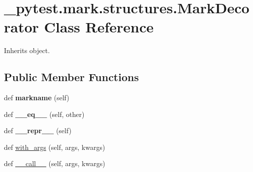 \hypertarget{class__pytest_1_1mark_1_1structures_1_1_mark_decorator}{}\section{\+\_\+pytest.\+mark.\+structures.\+Mark\+Decorator Class Reference}
\label{class__pytest_1_1mark_1_1structures_1_1_mark_decorator}


Inherits object.

\subsection*{Public Member Functions}
\begin{DoxyCompactItemize}
\item 
\mbox{\label{class__pytest_1_1mark_1_1structures_1_1_mark_decorator_adea6313d0a0d96bab5309e79c8d46d6d}} 
def {\bfseries markname} (self)
\item 
\mbox{\label{class__pytest_1_1mark_1_1structures_1_1_mark_decorator_a905fa9299ebee538fcb21bc63acd012b}} 
def {\bfseries \+\_\+\+\_\+eq\+\_\+\+\_\+} (self, other)
\item 
\mbox{\label{class__pytest_1_1mark_1_1structures_1_1_mark_decorator_ae5042192d84bab62288f84c38edc9b1f}} 
def {\bfseries \+\_\+\+\_\+repr\+\_\+\+\_\+} (self)
\item 
def \hyperlink{class__pytest_1_1mark_1_1structures_1_1_mark_decorator_a32ce2a8c2fe231d04e4485952d742f77}{with\+\_\+args} (self, args, kwargs)
\item 
def \hyperlink{class__pytest_1_1mark_1_1structures_1_1_mark_decorator_a1213b316f242fe70d23d1ba830b62606}{\+\_\+\+\_\+call\+\_\+\+\_\+} (self, args, kwargs)
\end{DoxyCompactItemize}

